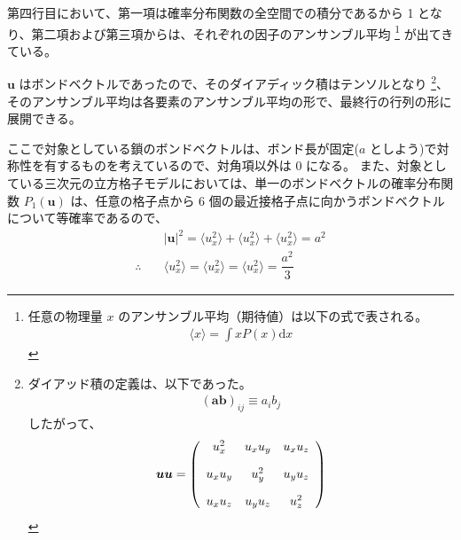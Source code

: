 \documentclass[uplatex,dvipdfmx,a4paper,11pt]{jsarticle}
\newcommand{\diff}{\mathrm d}
\begin{document}
\begin{enumerate}
第四行目において、第一項は確率分布関数の全空間での積分であるから 1 となり、第二項および第三項からは、それぞれの因子のアンサンブル平均
\footnote
{
任意の物理量 $x$ のアンサンブル平均（期待値）は以下の式で表される。
\begin{align*}
\langle x \rangle = \int x P(x) \diff x
\end{align*}
}
が出てきている。

$\bm{u}$ はボンドベクトルであったので、そのダイアディック積はテンソルとなり
\footnote
{
ダイアッド積の定義は、以下であった。
\begin{align*}
(\bm{a} \bm{b})_{ij} \equiv a_i b_j
\end{align*}
したがって、
\begin{align*}
\bm{u} \bm{u}
=
	\left(
	\begin{array}{c c c}
	u_x^2 		& u_x u_y	& u_x u_z \\[10pt]
	u_x u_y  	& u_y^2 	& u_y u_z \\[10pt]
	u_x u_z  	& u_y u_z 	& u_z^2
	\end{array}
	\right)
\end{align*}
}、
そのアンサンブル平均は各要素のアンサンブル平均の形で、最終行の行列の形に展開できる。

ここで対象としている鎖のボンドベクトルは、ボンド長が固定($a$ としよう)で対称性を有するものを考えているので、対角項以外は 0 になる。
また、対象としている三次元の立方格子モデルにおいては、単一のボンドベクトルの確率分布関数 $P_1 (\bm{u})$ は、任意の格子点から $6$ 個の最近接格子点に向かうボンドベクトルについて等確率であるので、
\begin{align*}
&|\bm{u}|^2 = \langle u_x^2 \rangle + \langle u_x^2 \rangle + \langle u_x^2 \rangle = a^2 \\
\therefore \quad &\langle u_x^2 \rangle = \langle u_x^2 \rangle = \langle u_x^2 \rangle = \dfrac{a^2}{3}
\end{align*}


\end{enumerate}
\end{document}
